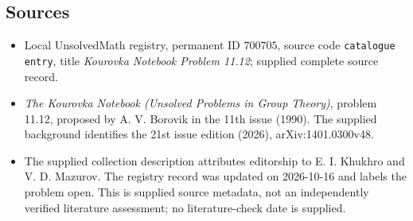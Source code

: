 \documentclass[11pt]{article}
\begin{document}
\subsection{Sources}
\begin{itemize}
\item Local UnsolvedMath registry, permanent ID \(700705\), source code \texttt{catalogue entry}, title \emph{Kourovka Notebook Problem 11.12}; supplied complete source record.
\item \emph{The Kourovka Notebook (Unsolved Problems in Group Theory)}, problem 11.12, proposed by A. V. Borovik in the 11th issue (1990). The supplied background identifies the 21st issue edition (2026), arXiv:1401.0300v48.
\item The supplied collection description attributes editorship to E. I. Khukhro and V. D. Mazurov. The registry record was updated on 2026-10-16 and labels the problem open. This is supplied source metadata, not an independently verified literature assessment; no literature-check date is supplied.
\end{itemize}
\end{document}

